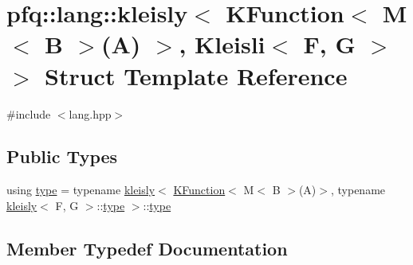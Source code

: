 \hypertarget{structpfq_1_1lang_1_1kleisly_3_01KFunction_3_01M_3_01B_01_4_07A_08_01_4_00_01Kleisli_3_01F_00_01G_01_4_01_4}{}\section{pfq\+:\+:lang\+:\+:kleisly$<$ K\+Function$<$ M$<$ B $>$(A) $>$, Kleisli$<$ F, G $>$ $>$ Struct Template Reference}
\label{structpfq_1_1lang_1_1kleisly_3_01KFunction_3_01M_3_01B_01_4_07A_08_01_4_00_01Kleisli_3_01F_00_01G_01_4_01_4}


{\ttfamily \#include $<$lang.\+hpp$>$}

\subsection*{Public Types}
\begin{DoxyCompactItemize}
\item 
using \hyperlink{structpfq_1_1lang_1_1kleisly_3_01KFunction_3_01M_3_01B_01_4_07A_08_01_4_00_01Kleisli_3_01F_00_01G_01_4_01_4_a0d400d4878fb63c2dd734b642e395020}{type} = typename \hyperlink{structpfq_1_1lang_1_1kleisly}{kleisly}$<$ \hyperlink{structpfq_1_1lang_1_1KFunction}{K\+Function}$<$ M$<$ B $>$(A)$>$, typename \hyperlink{structpfq_1_1lang_1_1kleisly}{kleisly}$<$ F, G $>$\+::\hyperlink{structpfq_1_1lang_1_1kleisly_3_01KFunction_3_01M_3_01B_01_4_07A_08_01_4_00_01Kleisli_3_01F_00_01G_01_4_01_4_a0d400d4878fb63c2dd734b642e395020}{type} $>$\+::\hyperlink{structpfq_1_1lang_1_1kleisly_3_01KFunction_3_01M_3_01B_01_4_07A_08_01_4_00_01Kleisli_3_01F_00_01G_01_4_01_4_a0d400d4878fb63c2dd734b642e395020}{type}
\end{DoxyCompactItemize}


\subsection{Member Typedef Documentation}
